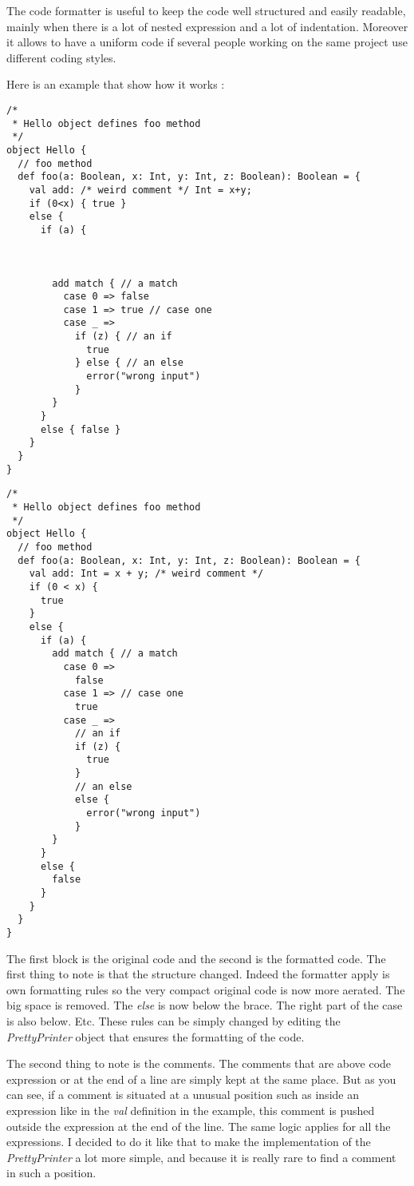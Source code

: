 The code formatter is useful to keep the code well structured and easily readable, mainly when there is a lot of nested expression and a lot of indentation. Moreover it allows to have a uniform code if several people working on the same project use different coding styles. 

Here is an example that show how it works :

\begin{lstlisting}
/*
 * Hello object defines foo method
 */
object Hello {
  // foo method
  def foo(a: Boolean, x: Int, y: Int, z: Boolean): Boolean = {
    val add: /* weird comment */ Int = x+y;
    if (0<x) { true }
    else {
      if (a) {
      
      
      
        add match { // a match
          case 0 => false
          case 1 => true // case one
          case _ =>
            if (z) { // an if
              true
            } else { // an else
              error("wrong input")
            }
        }
      }
      else { false }
    }
  }
}
\end{lstlisting} 

\begin{lstlisting}
/*
 * Hello object defines foo method
 */
object Hello { 
  // foo method
  def foo(a: Boolean, x: Int, y: Int, z: Boolean): Boolean = {
    val add: Int = x + y; /* weird comment */
    if (0 < x) {
      true
    }
    else {
      if (a) {
        add match { // a match
          case 0 =>
            false
          case 1 => // case one
            true
          case _ =>
            // an if
            if (z) {
              true
            }
            // an else
            else {
              error("wrong input")
            }
        }
      }
      else {
        false
      }
    }
  }
}
\end{lstlisting}

The first block is the original code and the second is the formatted code. The first thing to note is that the structure changed. Indeed the formatter apply is own formatting rules so the very compact original code is now more aerated. The big space is removed. The \emph{else} is now below the brace. The right part of the case is also below. Etc. These rules can be simply changed by editing the \emph{PrettyPrinter} object that ensures the formatting of the code. 

The second thing to note is the comments. The comments that are above code expression or at the end of a line are simply kept at the same place. But as you can see, if a comment is situated at a unusual position such as inside an expression like in the \emph{val} definition in the example, this comment is pushed outside the expression at the end of the line. The same logic applies for all the expressions. I decided to do it like that to make the implementation of the \emph{PrettyPrinter} a lot more simple, and because it is really rare to find a comment in such a position. 


